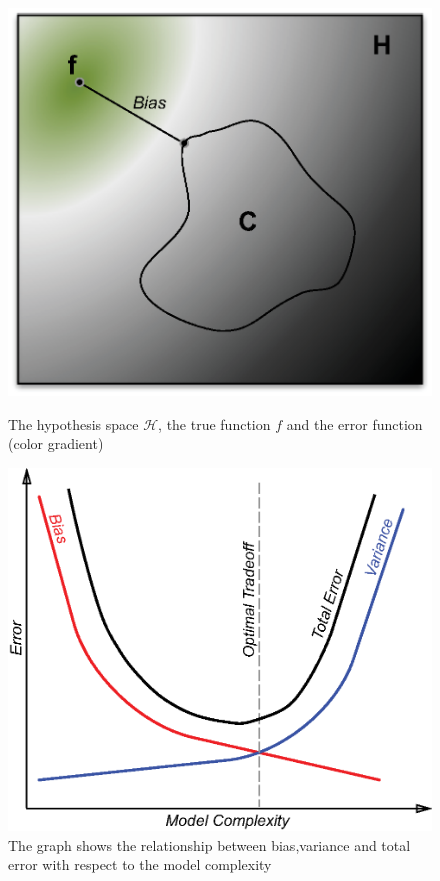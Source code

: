       	\begin{figure}[!tbp]
      	  \centering
      	  \begin{minipage}[b]{0.4\textwidth}
      	    \includegraphics[scale=0.55]{images/biasvariance.eps}
      	    \caption{The hypothesis space $\mathcal{H}$, the true function $f$ and the error function (color gradient) }
      			\label{fig:biasvariance}
      	  \end{minipage}
      	  \hfill
      	  \begin{minipage}[b]{0.5\textwidth}
      	    \includegraphics[scale=0.55]{images/biasvariancegraph.eps}
      	    \caption{The graph shows the relationship between bias,variance and total error with respect to the model complexity}
      			\label{fig:biasvariancegraph}
      	  \end{minipage}
      	\end{figure}



